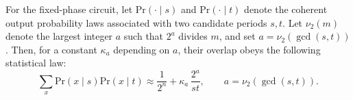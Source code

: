 \begin{lemma}
\label{lem:hp1_period_law_overlap}
For the fixed-phase  circuit, let \(\mathrm{Pr}(\cdot\mid s)\) and
\(\mathrm{Pr}(\cdot\mid t)\) denote the coherent output probability laws associated with two candidate
periods \(s,t\).  Let \(\nu_2(m)\) denote the largest integer \(a\) such that
\(2^a\) divides \(m\), and set \(a=\nu_2(\gcd(s,t))\).  Then, for a constant
\(\kappa_a\) depending on \(a\), their overlap obeys the following statistical
law:
\begin{equation}
    \sum_x \mathrm{Pr}(x\mid s)\mathrm{Pr}(x\mid t)
    \approx
    \frac{1}{2^n}
    +
    \kappa_a\,\frac{2^a}{st},
    \qquad
    a=\nu_2(\gcd(s,t)).
    \label{eq:hp1_period_law_overlap_placeholder}
\end{equation}
\end{lemma}

